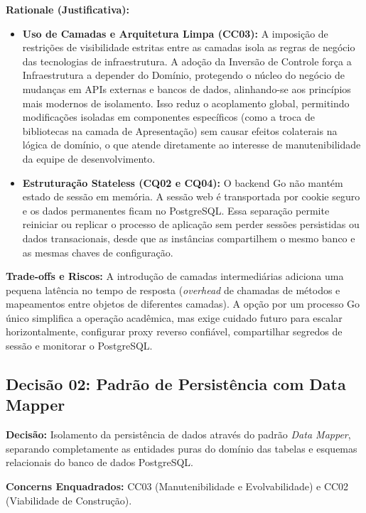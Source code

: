 ﻿\documentclass[12pt,a4paper]{article}
\begin{document}
\vspace{0.3cm}
\noindent\textbf{Rationale (Justificativa):} 
\begin{itemize}
    \item \textbf{Uso de Camadas e Arquitetura Limpa (CC03):} A imposição de restrições de visibilidade estritas entre as camadas isola as regras de negócio das tecnologias de infraestrutura. A adoção da Inversão de Controle força a Infraestrutura a depender do Domínio, protegendo o núcleo do negócio de mudanças em APIs externas e bancos de dados, alinhando-se aos princípios mais modernos de isolamento. Isso reduz o acoplamento global, permitindo modificações isoladas em componentes específicos (como a troca de bibliotecas na camada de Apresentação) sem causar efeitos colaterais na lógica de domínio, o que atende diretamente ao interesse de manutenibilidade da equipe de desenvolvimento.
    \item \textbf{Estruturação Stateless (CQ02 e CQ04):} O backend Go não mantém estado de sessão em memória. A sessão web é transportada por cookie seguro e os dados permanentes ficam no PostgreSQL. Essa separação permite reiniciar ou replicar o processo de aplicação sem perder sessões persistidas ou dados transacionais, desde que as instâncias compartilhem o mesmo banco e as mesmas chaves de configuração.
\end{itemize}

\noindent\textbf{Trade-offs e Riscos:} A introdução de camadas intermediárias adiciona uma pequena latência no tempo de resposta (\textit{overhead} de chamadas de métodos e mapeamentos entre objetos de diferentes camadas). A opção por um processo Go único simplifica a operação acadêmica, mas exige cuidado futuro para escalar horizontalmente, configurar proxy reverso confiável, compartilhar segredos de sessão e monitorar o PostgreSQL.

\subsection{Decisão 02: Padrão de Persistência com Data Mapper}

\noindent\textbf{Decisão:} Isolamento da persistência de dados através do padrão \textit{Data Mapper}, separando completamente as entidades puras do domínio das tabelas e esquemas relacionais do banco de dados PostgreSQL.

\vspace{0.3cm}
\noindent\textbf{Concerns Enquadrados:} CC03 (Manutenibilidade e Evolvabilidade) e CC02 (Viabilidade de Construção).
\end{document}
